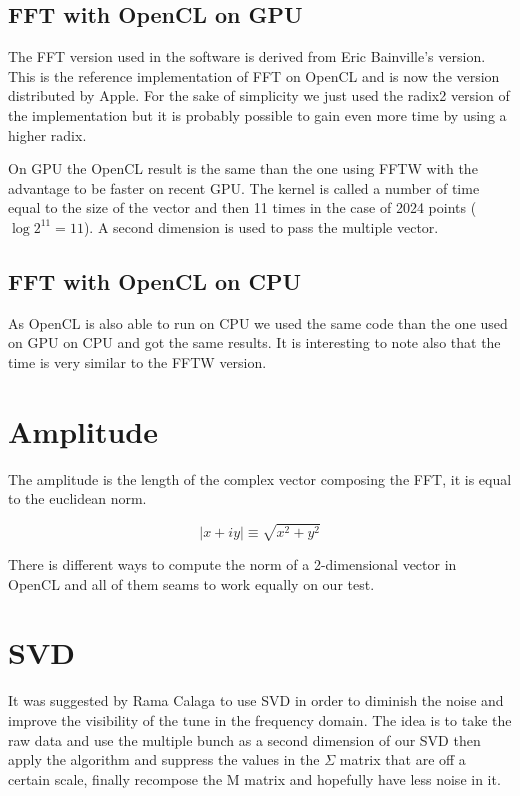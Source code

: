   	\subsection{FFT with OpenCL on GPU}

   	The \gls{FFT} version used in the software is derived from Eric Bainville's version. This is the reference implementation of \gls{FFT} on \gls{OpenCL} and is now the version distributed by Apple\cite{bainville11}. For the sake of simplicity we just used the radix2 version of the implementation but it is probably possible to gain even more time by using a higher radix.

   	On \gls{GPU} the \gls{OpenCL} result is the same than the one using \gls{FFTW} with the advantage to be faster on recent \gls{GPU}. The kernel is called a number of time equal to the size of the vector and then 11 times in the case of 2024 points ($\log{2^{11}} = 11$). A second dimension is used to pass the multiple vector.

   	\subsection{FFT with OpenCL on CPU}

   	As \gls{OpenCL} is also able to run on \gls{CPU} we used the same code than the one used on \gls{GPU} on \gls{CPU} and got the same results. It is interesting to note also that the time is very similar to the \gls{FFTW} version.

\section{Amplitude}
\label{sec:amplitude}

The amplitude is the length of the complex vector composing the \gls{FFT}, it is equal to the euclidean norm. 

$$ \mid x + i y \mid \equiv \sqrt{x^2 + y^2}$$ 

There is different ways to compute the norm of a 2-dimensional vector in \gls{OpenCL} and all of them seams to work equally on our test.

\section{SVD}
\label{sec:SVD}

It was suggested by Rama Calaga\cite{calaga06} to use \gls{SVD} in order to diminish the noise and improve the visibility of the tune in the frequency domain. The idea is to take the raw data and use the multiple bunch as a second dimension of our SVD then apply the algorithm and suppress the values in the $\Sigma$ matrix that are off a certain scale, finally recompose the M matrix and hopefully have less noise in it.

